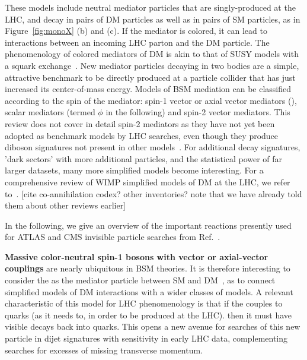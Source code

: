 These models include neutral mediator particles that are singly-produced at the LHC, and decay in pairs of DM particles as well as in pairs of SM particles, as in Figure~\ref{fig:monoX} (b) and (c). If the mediator is colored, it can lead to interactions between an incoming LHC parton and the DM particle. The phenomenology of colored mediators of DM is akin to that of SUSY models with a squark exchange~\cite{Papucci:2014iwa,An:2013xka,Bell:2012rg}. New mediator particles decaying in two bodies
are a simple, attractive benchmark to be directly produced at a particle collider that has just increased its center-of-mass energy. Models of BSM mediation can be classified according to the spin of the mediator: spin-1 vector or axial vector mediators (\Zprime), scalar mediators (termed $\phi$ in the following) and spin-2 vector mediators. This review does not cover in detail spin-2 mediators as they have not yet been adopted as benchmark models by LHC searches, even though they produce diboson signatures not present in other models~\cite{Kraml:2017atm,Han:2015cty}. For additional decay signatures, 'dark sectors' with more additional particles, and the statistical power of far larger datasets, many more simplified models become interesting. For a comprehensive review of WIMP simplified models of DM at the LHC, we refer to~\cite{Arcadi:2017kky}. [cite co-annihilation codex? other inventories? note that we have already told them about other reviews earlier]

In the following, we give an overview of the important reactions presently used for ATLAS and CMS invisible particle searches from Ref.~\cite{Abercrombie:2015wmb}.

\textbf{Massive color-neutral spin-1 bosons with vector or axial-vector couplings} are nearly ubiquitous in BSM theories. 
It is therefore interesting to consider the \Zprime as the mediator particle between SM and DM~\cite{Shoemaker:2011vi},
as to connect simplified models of DM interactions with a wider classes of models.
A relevant characteristic of this model for LHC phenomenology is that if the \Zprime couples to quarks (as it needs to, in order to be produced at the LHC). 
then it must have visible decays back into quarks. This opens a new avenue for searches of this new
particle in dijet signatures with sensitivity in early LHC data, complementing searches for excesses
of missing transverse momentum. 

